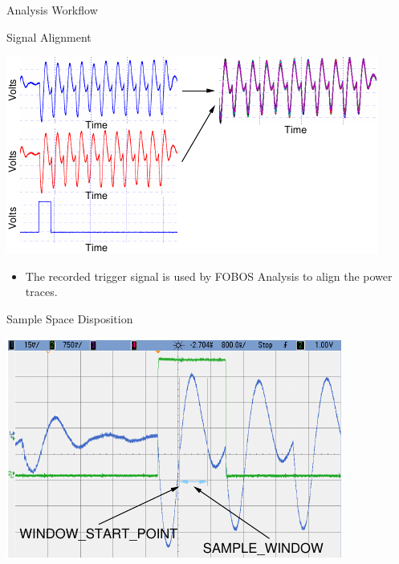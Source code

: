 \documentclass[xcolor=pdftex,dvipsnames,table,final]{beamer}
\begin{document}
\begin{frame}[fragile]{}
\begin{columns}[t]
\begin{column}{.31\linewidth}
\begin{block}{Analysis Workflow}
       \end{block}
       \begin{block}{Signal Alignment}
        \begin{minipage}[t]{0.49\linewidth}
          \includegraphics[scale=2.4]{../figures/tracealingment}
        \end{minipage}%
        \begin{minipage}[t]{0.49\linewidth}
         \vspace{-4cm}
         \begin{itemize}
          \item The recorded trigger signal is used by FOBOS Analysis to align the
                power traces.
         \end{itemize} 
        \end{minipage}
       \end{block}
       \begin{block}{Sample Space Disposition}
        \begin{minipage}[t]{0.49\linewidth}%
		\includegraphics[width=0.9\linewidth]{../figures/oscilloscope-sample-window}

\end{minipage}
\end{block}
\end{column}
\end{columns}
\end{frame}
\end{document}
